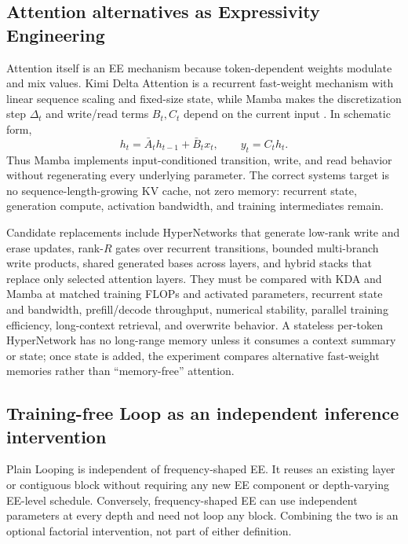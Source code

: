 \documentclass[10pt]{article}
\begin{document}
\subsection{Attention alternatives as Expressivity Engineering}

Attention itself is an EE mechanism because token-dependent weights modulate
and mix values.  Kimi Delta Attention is a recurrent fast-weight mechanism
with linear sequence scaling and fixed-size state, while Mamba makes the
discretization step $\Delta_t$ and write/read terms $B_t,C_t$ depend on the
current input \citep{kimit2025linear,schlag2021fastweights,gu2023mamba}.  In
schematic form,
\begin{equation}
 h_t=\bar A_t h_{t-1}+\bar B_t x_t,
 \qquad y_t=C_t h_t.
\end{equation}
Thus Mamba implements input-conditioned transition, write, and read behavior
without regenerating every underlying parameter.  The correct systems target
is no sequence-length-growing KV cache, not zero memory: recurrent state,
generation compute, activation bandwidth, and training intermediates remain.

Candidate replacements include HyperNetworks that generate low-rank write and
erase updates, rank-$R$ gates over recurrent transitions, bounded
multi-branch write products, shared generated bases across layers, and hybrid
stacks that replace only selected attention layers.  They must be compared
with KDA and Mamba at matched training FLOPs and activated parameters, recurrent
state and bandwidth, prefill/decode throughput, numerical stability, parallel
training efficiency, long-context retrieval, and overwrite behavior.  A
stateless per-token HyperNetwork has no long-range memory unless it consumes a
context summary or state; once state is added, the experiment compares
alternative fast-weight memories rather than ``memory-free'' attention.

\subsection{Training-free Loop as an independent inference intervention}

Plain Looping is independent of frequency-shaped EE.  It reuses an existing
layer or contiguous block without requiring any new EE component or
depth-varying EE-level schedule.  Conversely, frequency-shaped EE can use
independent parameters at every depth and need not loop any block.  Combining
the two is an optional factorial intervention, not part of either definition.
\end{document}
